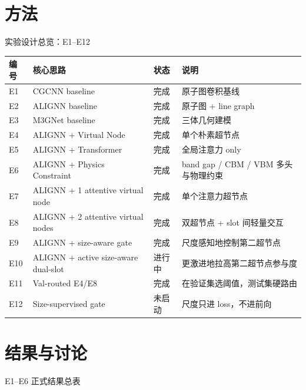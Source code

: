 \documentclass{beamer}
\begin{document}
\section{方法}

\begin{frame}{实验设计总览：E1--E12}
\tiny
\centering
\setlength{\tabcolsep}{3pt}
\begin{tabular}{p{0.75cm} p{4.7cm} p{1.7cm} p{3.0cm}}
\toprule
编号 & 核心思路 & 状态 & 说明 \\
\midrule
E1 & CGCNN baseline & 完成 & 原子图卷积基线 \\
E2 & ALIGNN baseline & 完成 & 原子图 + line graph \\
E3 & M3GNet baseline & 完成 & 三体几何建模 \\
E4 & ALIGNN + Virtual Node & 完成 & 单个朴素超节点 \\
E5 & ALIGNN + Transformer & 完成 & 全局注意力 only \\
E6 & ALIGNN + Physics Constraint & 完成 & band gap / CBM / VBM 多头与物理约束 \\
E7 & ALIGNN + 1 attentive virtual node & 完成 & 单个注意力超节点 \\
E8 & ALIGNN + 2 attentive virtual nodes & 完成 & 双超节点 + slot 间轻量交互 \\
E9 & ALIGNN + size-aware gate & 完成 & 尺度感知地控制第二超节点 \\
E10 & ALIGNN + active size-aware dual-slot & 进行中 & 更激进地拉高第二超节点参与度 \\
E11 & Val-routed E4/E8 & 完成 & 在验证集选阈值，测试集硬路由 \\
E12 & Size-supervised gate & 未启动 & 尺度只进 loss，不进前向 \\
\bottomrule
\end{tabular}
\end{frame}

\section{结果与讨论}

\begin{frame}{E1--E6 正式结果总表}
\scriptsize
\centering
{}
\end{frame}
\end{document}
